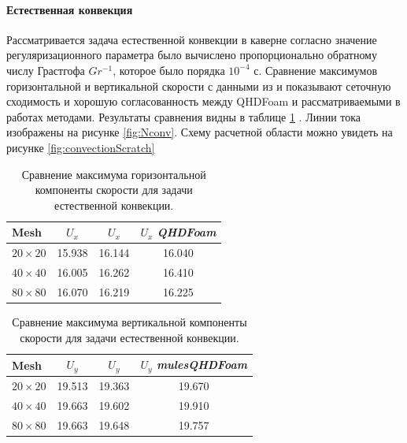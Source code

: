 \paragraph{Естественная конвекция}

Рассматривается задача естественной конвекции в каверне согласно \cite{ElizarBook} значение регуляризационного параметра было вычислено пропорционально обратному числу Грастгофа $Gr^{-1}$, которое было порядка $10^{-4}$ с. Сравнение максимумов горизонтальной и вертикальной скорости с данными из \cite{ElizarBook} и \cite{Vabishevich} показывают сеточную сходимость и хорошую согласованность между QHDFoam и рассматриваемыми в работах методами. Результаты сравнения видны в таблице \ref{table:tabHotCavityHor} . Линии тока изображены на рисунке \ref{fig:Nconv}. Схему расчетной области можно увидеть на рисунке \ref{fig:convectionScratch}

\begin{table}[!hb]
\caption { Сравнение максимума горизонтальной компоненты скорости для задачи естественной конвекции.}
\noindent\begin{tabular}{l|ccc}
Mesh & $U_x$ \cite{ElizarBook} & $U_x$ \cite{Vabishevich} & $U_x$ \textit{QHDFoam} \\
\hline
$20\times20$ & 15.938 & 16.144 & 16.040\\
$40\times40$ & 16.005 & 16.262 & 16.410\\
$80\times80$ & 16.070 & 16.219 & 16.225
\end{tabular}
\label{table:tabHotCavityHor}
\end{table}

 \begin{table}[!h]
\centering
\caption {Сравнение максимума вертикальной компоненты скорости для задачи естественной конвекции.}
\noindent\begin{tabular}{l|ccc}
Mesh & $U_y$ \cite{ElizarBook} & $U_y$ \cite{Vabishevich} & $U_y$ \textit{mulesQHDFoam} \\
\hline
$20\times20$ & 19.513 & 19.363 & 19.670\\
$40\times40$ & 19.663 & 19.602 & 19.910\\
$80\times80$ & 19.663 & 19.648 & 19.757
\end{tabular}
\label{table:tabHotCavityVer}
\end{table}

